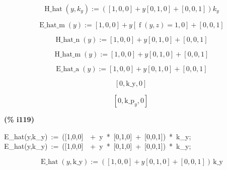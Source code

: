 \documentclass[fleqn]{article}
\begin{document}
\[\tag{\% o111} 
\operatorname{H\_ hat}\left( y\operatorname{,}{k_y}\right) \operatorname{:=}\left( \left[ 1\operatorname{,}0\operatorname{,}0\right] +y \left[ 0\operatorname{,}1\operatorname{,}0\right] +\left[ 0\operatorname{,}0\operatorname{,}1\right] \right)  {k_y}\mbox{}\]

\[\tag{\% o112} 
\operatorname{E\_ hat\_ m}(y)\operatorname{:=}\left[ 1\operatorname{,}0\operatorname{,}0\right] +y \left[ \operatorname{f}\left( y\operatorname{,}z\right) =1\operatorname{,}0\right] +\left[ 0\operatorname{,}0\operatorname{,}1\right] \mbox{}\]

\[\tag{\% o113} 
\operatorname{H\_ hat\_ n}(y)\operatorname{:=}\left[ 1\operatorname{,}0\operatorname{,}0\right] +y \left[ 0\operatorname{,}1\operatorname{,}0\right] +\left[ 0\operatorname{,}0\operatorname{,}1\right] \mbox{}\]

\[\tag{\% o114} 
\operatorname{H\_ hat\_ m}(y)\operatorname{:=}\left[ 1\operatorname{,}0\operatorname{,}0\right] +y \left[ 0\operatorname{,}1\operatorname{,}0\right] +\left[ 0\operatorname{,}0\operatorname{,}1\right] \mbox{}\]

\[\tag{\% o115} 
\operatorname{E\_ hat\_ a}(y)\operatorname{:=}\left[ 1\operatorname{,}0\operatorname{,}0\right] +y \left[ 0\operatorname{,}1\operatorname{,}0\right] +\left[ 0\operatorname{,}0\operatorname{,}1\right] \mbox{}\]

\[\tag{\% o116} 
\left[ 0\operatorname{,}\ensuremath{\mathrm{k\_ y}}\operatorname{,}0\right] \mbox{}\]

\[\tag{\% o117} 
\left[ 0\operatorname{,}{{\ensuremath{\mathrm{k\_ p}}}_y}\operatorname{,}0\right] \mbox{}
\]


\noindent
\begin{minipage}[t]{4.000000em}\color{red}\bfseries
(\% i119)	
\end{minipage}
\begin{minipage}[t]{\textwidth}\color{blue}
E\_hat(y,k\_y)\ :=\ ([1,0,0]\ \ +\ y\ *\ [0,1,0]\ +\ [0,0,1])\ *\ k\_y;\\
E\_hat(y,k\_y)\ :=\ ([1,0,0]\ \ +\ y\ *\ [0,1,0]\ +\ [0,0,1])\ *\ k\_y;
\end{minipage}
\[\displaystyle \tag{\% o118} 
\operatorname{E\_ hat}\left( y\operatorname{,}\ensuremath{\mathrm{k\_ y}}\right) \operatorname{:=}\left( \left[ 1\operatorname{,}0\operatorname{,}0\right] +y \left[ 0\operatorname{,}1\operatorname{,}0\right] +\left[ 0\operatorname{,}0\operatorname{,}1\right] \right) \, \ensuremath{\mathrm{k\_ y
}}\mbox{}\]
\end{document}
